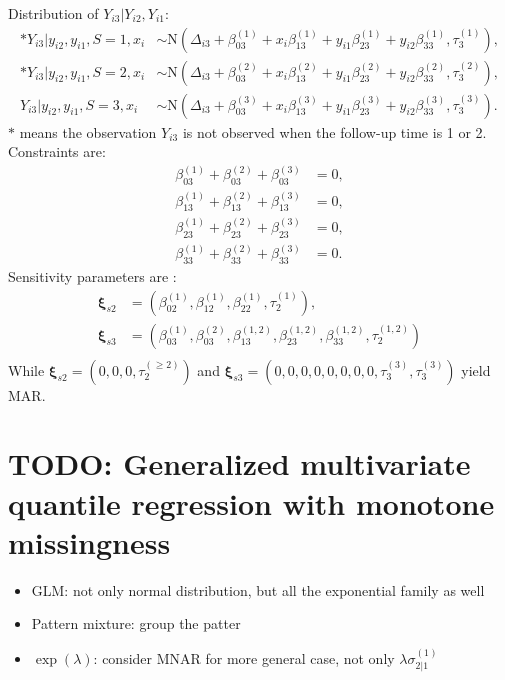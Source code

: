 \documentclass[12pt]{article}
\begin{document}
Distribution of $Y_{i3} | Y_{i2}, Y_{i1}$:
\begin{align}
  \label{eq:tri3}
  * Y_{i3} | y_{i2}, y_{i1} , S = 1, x_i & \sim \textrm{N}(\Delta_{i3} + \beta_{03}^{(1)} + x_i\beta_{13}^{(1)} + y_{i1}\beta_{23}^{(1)} + y_{i2}\beta_{33}^{(1)}, \tau_3^{(1)}),  \\
  * Y_{i3} | y_{i2}, y_{i1} , S = 2, x_i & \sim \textrm{N}(\Delta_{i3} + \beta_{03}^{(2)} + x_i\beta_{13}^{(2)} + y_{i1}\beta_{23}^{(2)} + y_{i2}\beta_{33}^{(2)}, \tau_3^{(2)}),  \\
  Y_{i3} | y_{i2}, y_{i1} , S = 3, x_i & \sim \textrm{N}(\Delta_{i3} + \beta_{03}^{(3)} +
  x_i\beta_{13}^{(3)} + y_{i1}\beta_{23}^{(3)} + y_{i2}\beta_{33}^{(3)}, \tau_3^{(3)}).
\end{align}
$*$ means the observation $Y_{i3}$ is not observed when the follow-up
time is 1 or 2. Constraints are:
\begin{align}
  \label{eq:constbi3}
  \beta_{03}^{(1)} + \beta_{03}^{(2)}  + \beta_{03}^{(3)}& = 0 , \\
  \beta_{13}^{(1)} + \beta_{13}^{(2)}  + \beta_{13}^{(3)}& = 0 , \\
  \beta_{23}^{(1)} + \beta_{23}^{(2)}  + \beta_{23}^{(3)}& = 0 , \\
  \beta_{33}^{(1)} + \beta_{33}^{(2)} + \beta_{33}^{(3)}& = 0 .
\end{align}
Sensitivity parameters are :
\begin{align*}
  \bm \xi_{s2} &= (\beta_{02}^{(1)}, \beta_{12}^{(1)}, \beta_{22}^{(1)}, \tau_2^{(1)}), \\
  \bm \xi_{s3} &= (\beta_{03}^{(1)},\beta_{03}^{(2)},  \beta_{13}^{(1,2)}, \beta_{23}^{(1, 2)}, \beta_{33}^{(1,2)}, \tau_2^{(1, 2)}) \\
\end{align*}
While $\bm \xi_{s2} = (0, 0, 0, \tau_2^{(\geq 2)})$ and $\bm \xi_{s3} = (0, 0, 0,
0, 0, 0, 0, 0, \tau_3^{(3)}, \tau_3^{(3)})$ yield MAR.
\section{TODO: Generalized multivariate quantile regression with monotone missingness }
\label{sec:general}

\begin{itemize}
\item GLM: not only normal distribution, but all the exponential family as well
\item Pattern mixture: group the patter
\item $\exp(\lambda)$: consider MNAR for more general case, not only $\lambda\sigma_{2|1}^{(1)}$
\end{itemize}
\end{document}

